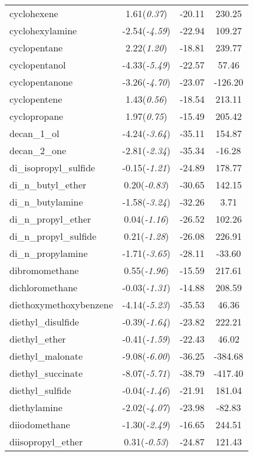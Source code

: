 \documentclass{amsart}
\begin{document}
\begin{center}
\begin{longtable}{l|c|c|c}
cyclohexene & 1.61(\textit{0.37}) & -20.11 & 230.25 \\ 
cyclohexylamine & -2.54(\textit{-4.59}) & -22.94 & 109.27 \\ 
cyclopentane & 2.22(\textit{1.20}) & -18.81 & 239.77 \\ 
cyclopentanol & -4.33(\textit{-5.49}) & -22.57 & 57.46 \\ 
cyclopentanone & -3.26(\textit{-4.70}) & -23.07 & -126.20 \\ 
cyclopentene & 1.43(\textit{0.56}) & -18.54 & 213.11 \\ 
cyclopropane & 1.97(\textit{0.75}) & -15.49 & 205.42 \\ 
decan\_1\_ol & -4.24(\textit{-3.64}) & -35.11 & 154.87 \\ 
decan\_2\_one & -2.81(\textit{-2.34}) & -35.34 & -16.28 \\ 
di\_isopropyl\_sulfide & -0.15(\textit{-1.21}) & -24.89 & 178.77 \\ 
di\_n\_butyl\_ether & 0.20(\textit{-0.83}) & -30.65 & 142.15 \\ 
di\_n\_butylamine & -1.58(\textit{-3.24}) & -32.26 & 3.71 \\ 
di\_n\_propyl\_ether & 0.04(\textit{-1.16}) & -26.52 & 102.26 \\ 
di\_n\_propyl\_sulfide & 0.21(\textit{-1.28}) & -26.08 & 226.91 \\ 
di\_n\_propylamine & -1.71(\textit{-3.65}) & -28.11 & -33.60 \\ 
dibromomethane & 0.55(\textit{-1.96}) & -15.59 & 217.61 \\ 
dichloromethane & -0.03(\textit{-1.31}) & -14.88 & 208.59 \\ 
diethoxymethoxybenzene & -4.14(\textit{-5.23}) & -35.53 & 46.36 \\ 
diethyl\_disulfide & -0.39(\textit{-1.64}) & -23.82 & 222.21 \\ 
diethyl\_ether & -0.41(\textit{-1.59}) & -22.43 & 46.02 \\ 
diethyl\_malonate & -9.08(\textit{-6.00}) & -36.25 & -384.68 \\ 
diethyl\_succinate & -8.07(\textit{-5.71}) & -38.79 & -417.40 \\ 
diethyl\_sulfide & -0.04(\textit{-1.46}) & -21.91 & 181.04 \\ 
diethylamine & -2.02(\textit{-4.07}) & -23.98 & -82.83 \\ 
diiodomethane & -1.30(\textit{-2.49}) & -16.65 & 244.51 \\ 
diisopropyl\_ether & 0.31(\textit{-0.53}) & -24.87 & 121.43 \\ 

\end{longtable}
\end{center}
\end{document}
